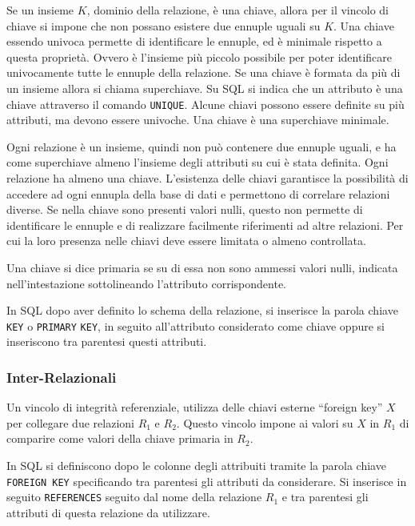 \documentclass{article}
\numberwithin{equation}{subsection}
\begin{document}
Se un insieme $K$, dominio della relazione, è una chiave, allora per il vincolo di chiave si impone che non possano esistere due ennuple uguali su $K$. Una chiave 
essendo univoca permette di identificare le ennuple, ed è minimale rispetto a questa proprietà. Ovvero è l'insieme più piccolo possibile per poter identificare univocamente 
tutte le ennuple della relazione. Se una chiave è formata da più di un insieme allora si chiama superchiave. Su SQL si indica che un attributo è una chiave attraverso 
il comando \verb|UNIQUE|. Alcune chiavi possono essere definite su più attributi, ma devono essere univoche. Una chiave è una superchiave minimale. 

Ogni relazione è un insieme, quindi non può contenere due ennuple uguali, e ha come superchiave almeno l'insieme degli attributi su cui è stata definita. Ogni relazione 
ha almeno una chiave. 
L'esistenza delle chiavi garantisce la possibilità di accedere ad ogni ennupla della base di dati e permettono di correlare relazioni diverse. 
Se nella chiave sono presenti valori nulli, questo non permette di identificare le ennuple e di realizzare facilmente riferimenti ad altre relazioni. Per cui la loro 
presenza nelle chiavi deve essere limitata o almeno controllata. 

Una chiave si dice primaria se su di essa non sono ammessi valori nulli, indicata nell'intestazione sottolineando l'attributo corrispondente. 


In SQL dopo aver definito lo schema della relazione, si inserisce la parola chiave \verb|KEY| o \verb|PRIMARY| \verb|KEY|, in seguito all'attributo considerato come 
chiave oppure si inseriscono tra parentesi questi attributi. 

\subsubsection{Inter-Relazionali}

Un vincolo di integrità referenziale, utilizza delle chiavi esterne ``foreign key'' $X$ per collegare due relazioni $R_1$ e $R_2$. Questo vincolo impone ai valori su 
$X$ in $R_1$ di comparire come valori della chiave primaria in $R_2$.  


In SQL si definiscono dopo le colonne degli attribuiti tramite la parola chiave \verb|FOREIGN KEY| specificando tra parentesi gli attributi da considerare. Si 
inserisce in seguito \verb|REFERENCES| seguito dal nome della relazione $R_1$ e tra parentesi gli attributi di questa relazione da utilizzare. 
\end{document}
